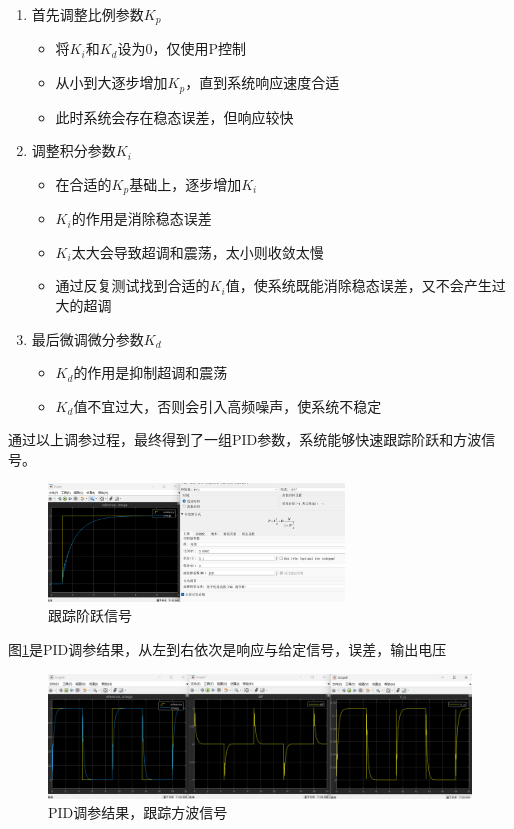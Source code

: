 \documentclass[12pt,a4paper,UTF8]{article}
\begin{document}
\begin{enumerate}
    \item 首先调整比例参数$K_p$
    \begin{itemize}
        \item 将$K_i$和$K_d$设为0，仅使用P控制
        \item 从小到大逐步增加$K_p$，直到系统响应速度合适
        \item 此时系统会存在稳态误差，但响应较快
    \end{itemize}

    \item 调整积分参数$K_i$
    \begin{itemize}
        \item 在合适的$K_p$基础上，逐步增加$K_i$
        \item $K_i$的作用是消除稳态误差
        \item $K_i$太大会导致超调和震荡，太小则收敛太慢
        \item 通过反复测试找到合适的$K_i$值，使系统既能消除稳态误差，又不会产生过大的超调
    \end{itemize}

    \item 最后微调微分参数$K_d$
    \begin{itemize}
        \item $K_d$的作用是抑制超调和震荡
        \item $K_d$值不宜过大，否则会引入高频噪声，使系统不稳定
    \end{itemize}
\end{enumerate}

通过以上调参过程，最终得到了一组PID参数，系统能够快速跟踪阶跃和方波信号。

\begin{figure}[htbp] \centering \includegraphics[width=0.7\textwidth]{2024-12-30-11-52-55.png} \caption{跟踪阶跃信号}\end{figure}

图\ref{fig:pid_tuning_result}是PID调参结果，从左到右依次是响应与给定信号，误差，输出电压


\begin{figure}[htbp] \centering \includegraphics[width=\textwidth]{2024-12-30-11-48-55.png} \caption{PID调参结果，跟踪方波信号} \label{fig:pid_tuning_result}\end{figure}
\end{document}
